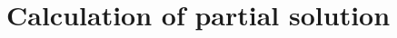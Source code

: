 \chapter{Calculation of partial solution} \label{app:partialsol}
\setcounter{figure}{0}\setcounter{equation}{0}\setcounter{table}{0}


%